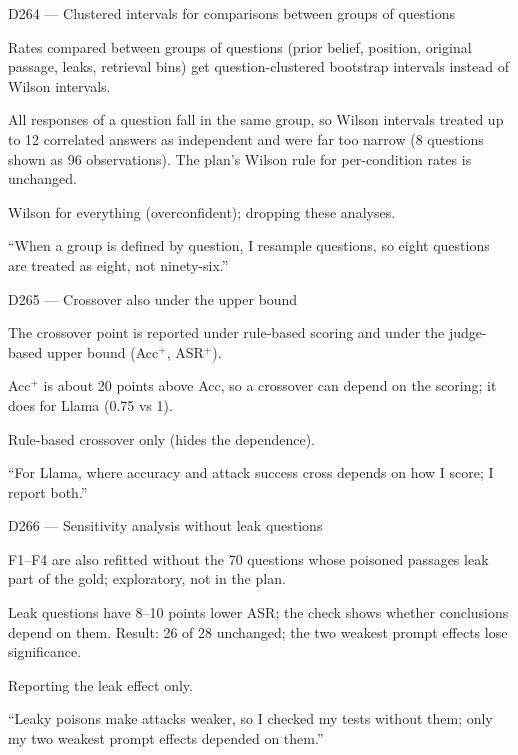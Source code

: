 \documentclass[11pt,a4paper]{report}
\begin{document}
\begin{decisionbox}{D264 --- Clustered intervals for comparisons between groups of questions}
\begin{description}[nosep, leftmargin=0pt]
  \item[Decision.] Rates compared between groups of questions (prior belief, position, original passage, leaks, retrieval bins) get question-clustered bootstrap intervals instead of Wilson intervals.
  \item[Why.] All responses of a question fall in the same group, so Wilson intervals treated up to 12 correlated answers as independent and were far too narrow (8 questions shown as 96 observations). The plan's Wilson rule for per-condition rates is unchanged.
  \item[Alternatives.] Wilson for everything (overconfident); dropping these analyses.
  \item[Interview line.] ``When a group is defined by question, I resample questions, so eight questions are treated as eight, not ninety-six.''
\end{description}
\end{decisionbox}

\begin{decisionbox}{D265 --- Crossover also under the upper bound}
\begin{description}[nosep, leftmargin=0pt]
  \item[Decision.] The crossover point is reported under rule-based scoring and under the judge-based upper bound (Acc$^{+}$, ASR$^{+}$).
  \item[Why.] Acc$^{+}$ is about 20 points above Acc, so a crossover can depend on the scoring; it does for Llama (0.75 vs 1).
  \item[Alternatives.] Rule-based crossover only (hides the dependence).
  \item[Interview line.] ``For Llama, where accuracy and attack success cross depends on how I score; I report both.''
\end{description}
\end{decisionbox}

\begin{decisionbox}{D266 --- Sensitivity analysis without leak questions}
\begin{description}[nosep, leftmargin=0pt]
  \item[Decision.] F1--F4 are also refitted without the 70 questions whose poisoned passages leak part of the gold; exploratory, not in the plan.
  \item[Why.] Leak questions have 8--10 points lower ASR; the check shows whether conclusions depend on them. Result: 26 of 28 unchanged; the two weakest prompt effects lose significance.
  \item[Alternatives.] Reporting the leak effect only.
  \item[Interview line.] ``Leaky poisons make attacks weaker, so I checked my tests without them; only my two weakest prompt effects depended on them.''
\end{description}
\end{decisionbox}
\end{document}
